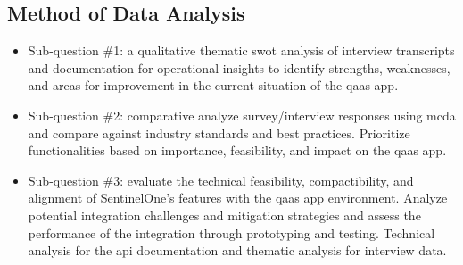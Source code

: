 \begin{multicols}{2}
  \subsection{Method of Data Analysis}
  \begin{itemize}[label=-]
    \item Sub-question \#1: a qualitative thematic \acrshort{swot} analysis of interview transcripts
          and documentation for operational insights to identify strengths, weaknesses, and areas for
          improvement in the current situation of the \acrshort{qaas} app.
    \item Sub-question \#2: comparative analyze survey/interview responses using \acrshort{mcda} and
          compare against industry standards and best practices. Prioritize functionalities based on
          importance, feasibility, and impact on the \acrshort{qaas} app.
    \item Sub-question \#3: evaluate the technical feasibility, compactibility, and alignment of
          SentinelOne's features with the \acrshort{qaas} app environment. Analyze potential integration
          challenges and mitigation strategies and assess the performance of the integration through
          prototyping and testing. Technical analysis for the \acrshort{api} documentation and
          thematic analysis for interview data.
  \end{itemize}

\end{multicols}
